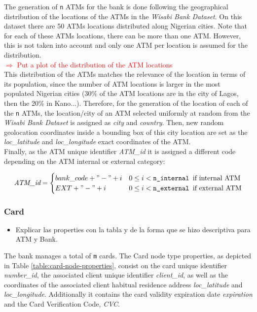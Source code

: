 \documentclass{article}
\begin{document}
The generation of \texttt{n} ATMs for the bank is done following
the geographical distribution of the locations of the ATMs in the \emph{Wisabi Bank Dataset}. 
On this dataset there are 50 ATMs locations distributed along Nigerian cities. 
Note that for each of these ATMs locations, there can be more than one ATM.
However, this is not taken into account and only one ATM per location is assumed for the 
distribution.\\
\textcolor{red}{$\Rightarrow$ Put a plot of the distribution of the ATM locations}\\
This distribution of the ATMs matches the relevance of the location in terms of its 
population, since the number of ATM locations is larger in the most populated 
Nigerian cities (30\% of the ATM locations are in the city of Lagos, then the 20\% in 
Kano...).
Therefore, for the generation of the location of each of the \texttt{n} ATMs, the location/city of an ATM selected uniformly at random from the \emph{Wisabi Bank Dataset} is assigned as \emph{city} and \emph{country}. Then, new random geolocation coordinates 
inside a bounding box of this city location are set as the \emph{loc\_latitude} and \emph{loc\_longitude} exact coordinates of the ATM. \\
Finally, as the ATM unique identifier \emph{ATM\_id} it is assigned a different code depending on the ATM internal or external category: 

\[
\emph{ATM\_id} =
\begin{cases} 
bank\_code + "-" + i & 0 \leq i < \texttt{n\_internal } \text{if internal ATM}  \\
EXT + "-" + i & 0 \leq i < \texttt{n\_external } \text{if external ATM}
\end{cases}
\]

\subsubsection*{Card}



\begin{itemize}
  \item Explicar las properties con la tabla y de la forma que se hizo descriptiva
  para ATM y Bank.
\end{itemize}

The bank manages a total of \texttt{m} cards. The Card node type properties, as depicted in Table
\ref{table:card-node-properties}, consist on the card unique 
identifier \emph{number\_id}, the associated client unique identifier \emph{client\_id}, as well
as the coordinates of the associated client habitual residence address \emph{loc\_latitude} and 
\emph{loc\_longitude}. Additionally it contains the card validity expiration date \emph{expiration}
and the Card Verification Code, \emph{CVC}.\\
\end{document}
